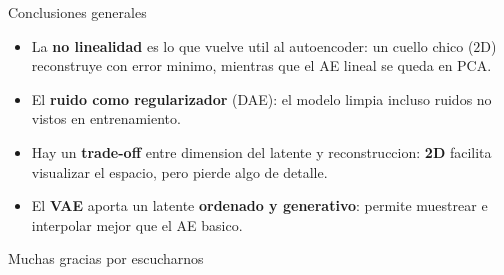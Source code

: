 \documentclass[aspectratio=169, 10pt]{beamer}
\begin{document}
\begin{frame}{Conclusiones generales}
  \begin{itemize}\setlength\itemsep{6pt}
    \item La \textbf{no linealidad} es lo que vuelve util al autoencoder: un cuello chico
          ($2$D) reconstruye con error minimo, mientras que el AE lineal se queda en PCA.
    \item El \textbf{ruido como regularizador} (DAE): el modelo limpia
    incluso ruidos no vistos en entrenamiento.
    \item Hay un \textbf{trade-off} entre dimension del latente y reconstruccion:
          \textbf{2D} facilita visualizar el espacio, pero pierde algo de detalle.
    \item El \textbf{VAE} aporta un latente \textbf{ordenado y generativo}:
          permite muestrear e interpolar mejor que el AE basico.
  \end{itemize}
\end{frame}

\begin{frame}[standout]
  Muchas gracias por escucharnos
\end{frame}
\end{document}
